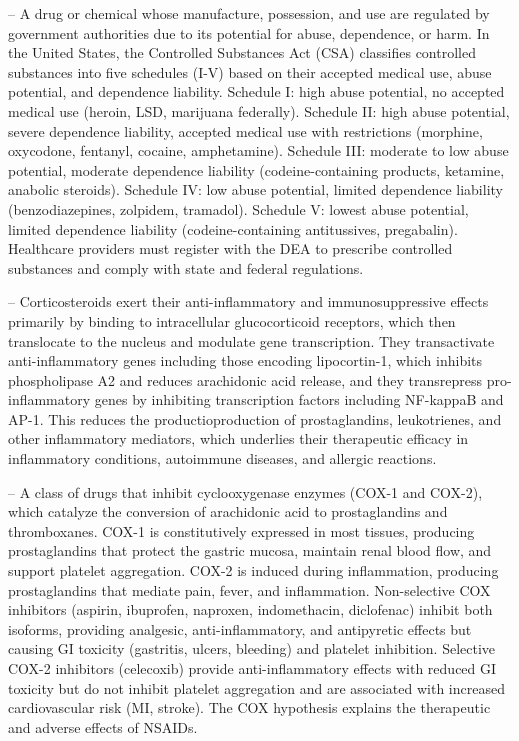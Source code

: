 -- A drug or chemical whose manufacture, possession, and use are regulated by government authorities due to its potential for abuse, dependence, or harm. In the United States, the Controlled Substances Act (CSA) classifies controlled substances into five schedules (I-V) based on their accepted medical use, abuse potential, and dependence liability. Schedule I: high abuse potential, no accepted medical use (heroin, LSD, marijuana federally). Schedule II: high abuse potential, severe dependence liability, accepted medical use with restrictions (morphine, oxycodone, fentanyl, cocaine, amphetamine). Schedule III: moderate to low abuse potential, moderate dependence liability (codeine-containing products, ketamine, anabolic steroids). Schedule IV: low abuse potential, limited dependence liability (benzodiazepines, zolpidem, tramadol). Schedule V: lowest abuse potential, limited dependence liability (codeine-containing antitussives, pregabalin). Healthcare providers must register with the DEA to prescribe controlled substances and comply with state and federal regulations.

-- Corticosteroids exert their anti-inflammatory and immunosuppressive effects primarily by binding to intracellular glucocorticoid receptors, which then translocate to the nucleus and modulate gene transcription. They transactivate anti-inflammatory genes including those encoding lipocortin-1, which inhibits phospholipase A2 and reduces arachidonic acid release, and they transrepress pro-inflammatory genes by inhibiting transcription factors including NF-kappaB and AP-1. This reduces the productioproduction of prostaglandins, leukotrienes, and other inflammatory mediators, which underlies their therapeutic efficacy in inflammatory conditions, autoimmune diseases, and allergic reactions.

-- A class of drugs that inhibit cyclooxygenase enzymes (COX-1 and COX-2), which catalyze the conversion of arachidonic acid to prostaglandins and thromboxanes. COX-1 is constitutively expressed in most tissues, producing prostaglandins that protect the gastric mucosa, maintain renal blood flow, and support platelet aggregation. COX-2 is induced during inflammation, producing prostaglandins that mediate pain, fever, and inflammation. Non-selective COX inhibitors (aspirin, ibuprofen, naproxen, indomethacin, diclofenac) inhibit both isoforms, providing analgesic, anti-inflammatory, and antipyretic effects but causing GI toxicity (gastritis, ulcers, bleeding) and platelet inhibition. Selective COX-2 inhibitors (celecoxib) provide anti-inflammatory effects with reduced GI toxicity but do not inhibit platelet aggregation and are associated with increased cardiovascular risk (MI, stroke). The COX hypothesis explains the therapeutic and adverse effects of NSAIDs.

